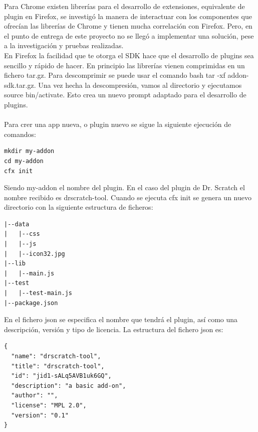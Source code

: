 \documentclass[a4paper, 12pt]{book}
\begin{document}
Para Chrome existen librerías para el desarrollo de extensiones, equivalente de plugin
en Firefox, se investigó la manera de interactuar con los componentes que ofrecían
las librerías de Chrome y tienen mucha correlación con Firefox. Pero, en el punto
de entrega de este proyecto no se llegó a implementar una solución, pese a la
investigación y pruebas realizadas. \\

En Firefox la facilidad que te otorga el SDK hace que el desarrollo de plugins sea 
sencillo y rápido de hacer. En principio las librerías vienen comprimidas en un
fichero tar.gz. Para descomprimir se puede usar el comando bash tar -xf addon-sdk.tar.gz.
Una vez hecha la descompresión, vamos al directorio y ejecutamos source bin/activate.
Esto crea un nuevo prompt adaptado para el desarrollo de plugins.\\ \\

Para crer una app nueva, o plugin nuevo se sigue la siguiente ejecución de comandos:
\begingroup
\fontsize{8pt}{9pt}\selectfont
\begin{verbatim}
mkdir my-addon
cd my-addon
cfx init
\end{verbatim}
\endgroup

Siendo my-addon el nombre del plugin. En el caso del plugin de Dr. Scratch el nombre
recibido es drscratch-tool. Cuando se ejecuta cfx init se genera un nuevo directorio
con la siguiente estructura de ficheros:
\begingroup
\fontsize{8pt}{9pt}\selectfont
\begin{verbatim}
|--data
|   |--css
|   |--js
|   |--icon32.jpg
|--lib
|   |--main.js
|--test
|   |--test-main.js
|--package.json
\end{verbatim}
\endgroup

En el fichero json se especifica el nombre que tendrá el plugin, así como una 
descripción, versión y tipo de licencia. La estructura del fichero json es: \\

\begingroup
\fontsize{8pt}{9pt}\selectfont
\begin{verbatim}
{
  "name": "drscratch-tool",
  "title": "drscratch-tool",
  "id": "jid1-sALq5AVB1uk6GQ",
  "description": "a basic add-on",
  "author": "",
  "license": "MPL 2.0",
  "version": "0.1"
}
\end{verbatim}
\endgroup
\end{document}
